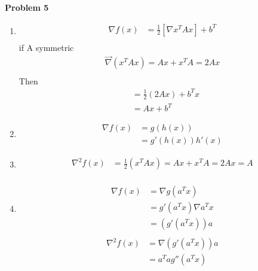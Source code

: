 \documentclass[11pt,letterpaper]{article}
\begin{document}
\textbf{Problem 5}
\begin{enumerate}[labelindent=0pt]
\item 
	\begin{align*}
	\nabla f(x) &= \tfrac{1}{2}[\nabla x^TAx]+b^T \\
	\end{align*}
if A symmetric \\
	\begin{align*}
	\vec{\nabla} (x^TAx)=Ax+x^TA=2Ax \\
	\end{align*}
Then \\
	\begin{align*}
	&= \tfrac{1}{2}(2Ax)+b^Tx \\
	&= Ax+b^T
	\end{align*}
\item 
	\begin{align*}
	\nabla f(x) & = g(h(x)) \\
	& = g'(h(x))h'(x)
	\end{align*}

\item
	\begin{align*}
	{\nabla}^2f(x) &= \frac{1}{2}(x^TAx)=Ax+x^TA=2Ax = A \\
	\end{align*}
\item
	\begin{align*}
	\nabla f(x) & = \nabla g(a^Tx) \\
	& = g'(a^Tx)\nabla a^Tx \\
	& = (g'(a^Tx))a \\ 
	\end{align*}
	\begin{align*}
	\nabla ^2 f(x) & = \nabla (g'(a^Tx))a \\
	& = a^Tag''(a^Tx)
	\end{align*}
\end{enumerate}
\end{document}
